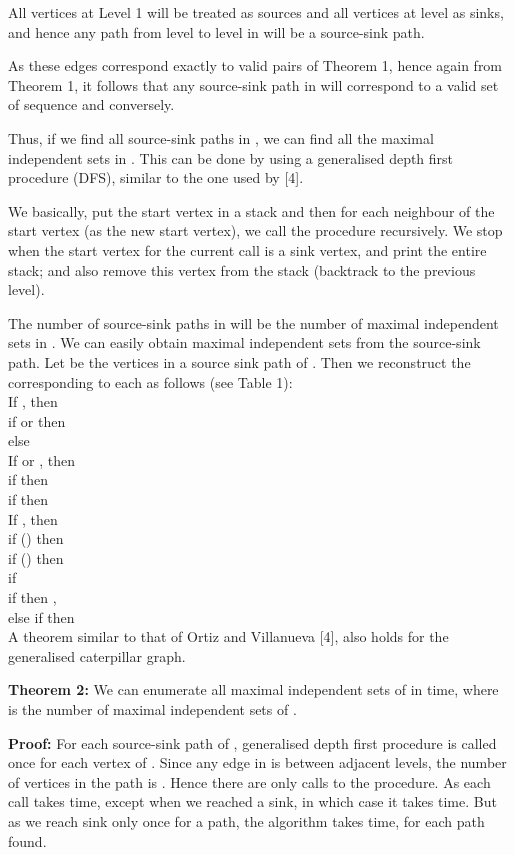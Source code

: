 \documentclass[10pt]{article}
\begin{document}
All vertices at Level 1 will be treated as sources and all vertices at
level  as sinks, and hence any path from level  to level  in
 will be a source-sink path.

As these edges correspond exactly to valid  pairs of
Theorem 1, hence again from Theorem 1, it follows that any source-sink
path in  will correspond to a valid set of sequence  and conversely.

Thus, if we find all source-sink paths in , we can find all the
maximal independent sets in . This can be done by using a
generalised depth first procedure (DFS), similar to the one used by [4]. 


We basically, put the start vertex in a stack and then for each neighbour
of the start vertex (as the new start vertex), we call the procedure
recursively. We stop when the start vertex for the current call is a sink
vertex, and print the entire stack; and also remove this vertex from the
stack (backtrack to the previous level). 

The number of source-sink paths in  will be the number of maximal
independent sets in .  We can easily obtain maximal
independent sets from the source-sink path.  Let  be
the vertices in a source sink path of . Then we reconstruct the
 corresponding to each  as follows (see Table 1):\\


\noindent If , then \\ if  or  then
\\ else \\

  
\noindent If  or , then\\ if  then
\\ if  then \\

\noindent If , then \\ if () then \\ if
() then \\ if \\ \indent if 
then ,\\ \indent else if  then
\\


A theorem similar to that of Ortiz and Villanueva [4], also holds for the
generalised caterpillar graph.

{\textbf{Theorem 2:}} We can enumerate all maximal independent sets of
 in  time, where  is
the number of maximal independent sets of .


{\textbf{Proof:}} For each source-sink path  of , generalised
depth first procedure is called once for each vertex of . Since any
edge in  is between adjacent levels, the number of vertices in the
path is . Hence there are only  calls to the procedure.  As
each call takes  time, except when we reached a sink, in which case
it takes  time. But as we reach sink only once for a path, the
algorithm takes  time, for each path found. 
\end{document}
